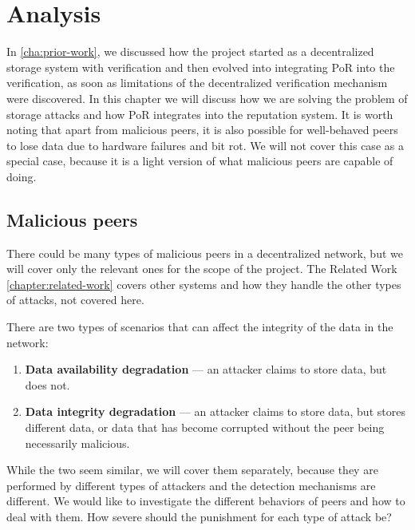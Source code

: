 \chapter{Analysis}
\label{chapter:analysis}

In \autoref{cha:prior-work}, we discussed how the project started as a decentralized
storage system with verification and then evolved into integrating PoR into the verification,
as soon as limitations of the decentralized verification mechanism were discovered.
In this chapter we will discuss how we are solving the problem of storage attacks
and how PoR integrates into the reputation system.
It is worth noting that apart from malicious peers, it is also possible for well-behaved peers to
lose data due to hardware failures and bit rot.
We will not cover this case as a special case, because it is a light version of what malicious
peers are capable of doing.

\section{Malicious peers}

There could be many types of malicious peers in a decentralized network,
but we will cover only the relevant ones for the scope of the project.
The Related Work \autoref{chapter:related-work} covers other systems and
how they handle the other types of attacks, not covered here.

There are two types of scenarios that can affect the integrity of the data in the network:
\begin{enumerate}
    \item \textbf{Data availability degradation} --- an attacker claims to store data, but does not.
    \item \textbf{Data integrity degradation} --- an attacker claims to store data, but stores different data, or
        data that has become corrupted without the peer being necessarily malicious.
\end{enumerate}

While the two seem similar, we will cover them separately, because they are performed by different types of attackers
and the detection mechanisms are different.
We would like to investigate the different behaviors of peers and how to deal with them.
How severe should the punishment for each type of attack be?

